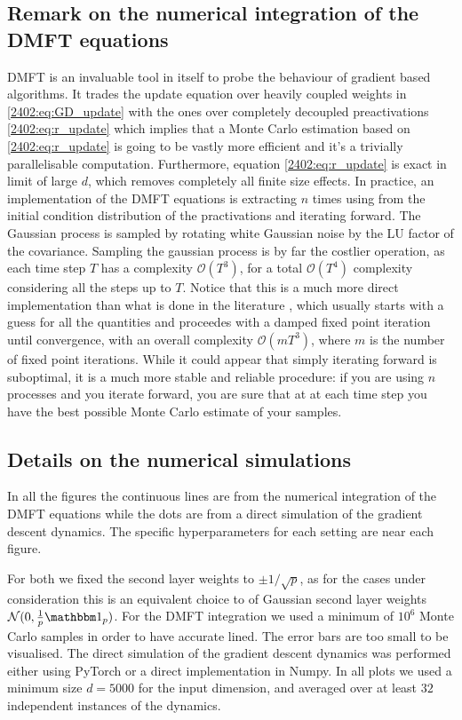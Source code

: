 \subsection{Remark on the numerical integration of the DMFT equations}
DMFT is an invaluable tool in itself to probe the behaviour of gradient based algorithms. It trades the update equation over heavily coupled weights in \eqref{2402:eq:GD_update} with the ones over completely decoupled preactivations \eqref{2402:eq:r_update} which implies that a Monte Carlo estimation based on \eqref{2402:eq:r_update} is going to be vastly more efficient and it's a trivially parallelisable computation.
Furthermore, equation \eqref{2402:eq:r_update} is exact in limit of large $d$, which removes completely all finite size effects.
In practice, an implementation of the DMFT equations is extracting $n$ times using from the initial condition distribution of the practivations and iterating forward.
The Gaussian process is sampled by rotating white Gaussian noise by the LU factor of the covariance. Sampling the gaussian process is by far the costlier operation, as each time step $T$ has a complexity $\mathcal{O}(T^3)$, for a total $\mathcal{O}(T^4)$ complexity considering all the steps up to $T$.
Notice that this is a much more direct implementation than what is done in the literature \citep{roy2019numerical,mignacco2020dynamical}, which usually starts with a guess for all the quantities and proceedes with a damped fixed point iteration until convergence, with an overall complexity $\mathcal{O}(mT^3)$, where $m$ is the number of fixed point iterations. While it could appear that simply iterating forward is suboptimal, it is a much more stable and reliable procedure: if you are using $n$ processes and you iterate forward, you are sure that at at each time step you have the best possible Monte Carlo estimate of your samples. 

\subsection{Details on the numerical simulations}
In all the figures the continuous lines are from the numerical integration of the DMFT equations while the dots are from a direct simulation of the gradient descent dynamics. The specific hyperparameters for each setting are near each figure.

For both we fixed the second layer weights to $\pm 1/\sqrt{p}$, as for the cases under consideration this is an equivalent choice to of Gaussian second layer weights $\mathcal{N}(0,\frac{1}{p}{\mathbbm 1}_p)$. For the DMFT integration we used a minimum of $10^6$ Monte Carlo samples in order to have accurate lined. The error bars are too small to be visualised. 
The direct simulation of the gradient descent dynamics was performed either using PyTorch or a direct implementation in Numpy. In all plots we used a minimum size $d=5000$ for the input dimension, and averaged over at least $32$ independent instances of the dynamics.

